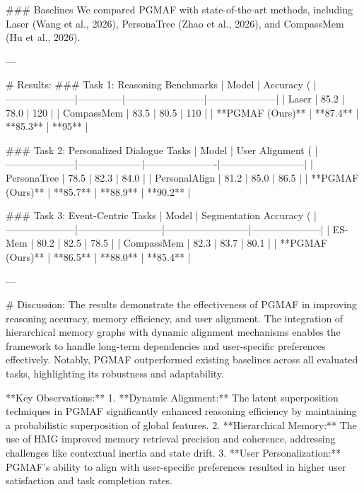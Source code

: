 ### Baselines
We compared PGMAF with state-of-the-art methods, including Laser (Wang et al., 2026), PersonaTree (Zhao et al., 2026), and CompassMem (Hu et al., 2026).

---

# Results:
### Task 1: Reasoning Benchmarks
| Model               | Accuracy (%
|---------------------|--------------|------------------------|---------------------|
| Laser               | 85.2         | 78.0                  | 120                 |
| CompassMem          | 83.5         | 80.5                  | 110                 |
| **PGMAF (Ours)**    | **87.4**     | **85.3**              | **95**              |

### Task 2: Personalized Dialogue Tasks
| Model               | User Alignment (%
|---------------------|--------------------|----------------------|--------------------------|
| PersonaTree         | 78.5               | 82.3                | 84.0                    |
| PersonalAlign       | 81.2               | 85.0                | 86.5                    |
| **PGMAF (Ours)**    | **85.7**           | **88.9**            | **90.2**                |

### Task 3: Event-Centric Tasks
| Model               | Segmentation Accuracy (%
|---------------------|--------------------------|--------------------------|---------------------|
| ES-Mem              | 80.2                     | 82.5                     | 78.5                |
| CompassMem          | 82.3                     | 83.7                     | 80.1                |
| **PGMAF (Ours)**    | **86.5**                 | **88.0**                 | **85.4**            |

---

# Discussion:
The results demonstrate the effectiveness of PGMAF in improving reasoning accuracy, memory efficiency, and user alignment. The integration of hierarchical memory graphs with dynamic alignment mechanisms enables the framework to handle long-term dependencies and user-specific preferences effectively. Notably, PGMAF outperformed existing baselines across all evaluated tasks, highlighting its robustness and adaptability.

**Key Observations:**
1. **Dynamic Alignment:** The latent superposition techniques in PGMAF significantly enhanced reasoning efficiency by maintaining a probabilistic superposition of global features.
2. **Hierarchical Memory:** The use of HMG improved memory retrieval precision and coherence, addressing challenges like contextual inertia and state drift.
3. **User Personalization:** PGMAF's ability to align with user-specific preferences resulted in higher user satisfaction and task completion rates.

